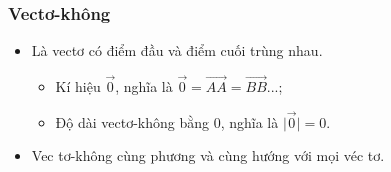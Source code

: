 \subsubsection{Vectơ-không}
	\begin{itemize}
		\item[\iconMT] Là vectơ có điểm đầu và điểm cuối trùng nhau. 
		\begin{itemize}
			\item Kí hiệu $\overrightarrow{0}$, nghĩa là $\overrightarrow{0}=\overrightarrow{AA}=\overrightarrow{BB}$...;
			\item Độ dài vectơ-không bằng $0$, nghĩa là $\bigg|\overrightarrow{0}\bigg|=0$.
		\end{itemize}

		\item[\iconMT]  Vec tơ-không cùng phương và cùng hướng với mọi véc tơ.
	\end{itemize}